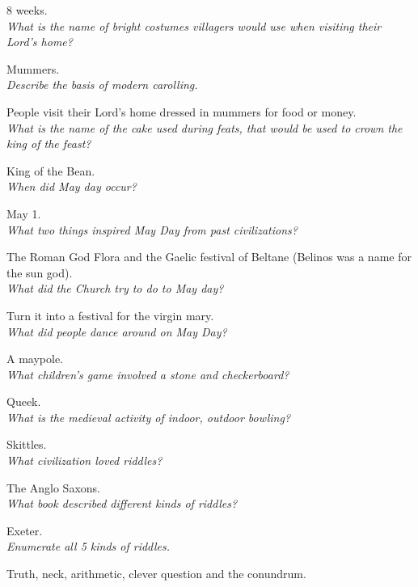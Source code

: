 \documentclass[12pt]{article}
\begin{document}
8 weeks. \\

\textit{What is the name of bright costumes villagers would use when visiting their Lord's home?}

Mummers.\\

\textit{Describe the basis of modern carolling.}

People visit their Lord's home dressed in mummers for food or money.\\

\textit{What is the name of the cake used during feats, that would be used to crown the king of the feast?}

King of the Bean.\\

\textit{When did May day occur?}

May 1.\\

\textit{What two things inspired May Day from past civilizations?}

The Roman God Flora and the Gaelic festival of Beltane (Belinos was a name for the sun god).\\

\textit{What did the Church try to do to May day?}

Turn it into a festival for the virgin mary.\\

\textit{What did people dance around on May Day?}

A maypole.\\

\textit{What children's game involved a stone and checkerboard?}

Queek.\\

\textit{What is the medieval activity of indoor, outdoor bowling?}

Skittles.\\

\textit{What civilization loved riddles?}

The Anglo Saxons.\\

\textit{What book described different  kinds of riddles?}

Exeter.\\

\textit{Enumerate all 5 kinds of riddles.}

Truth, neck, arithmetic, clever question and the conundrum.\\
\end{document}
